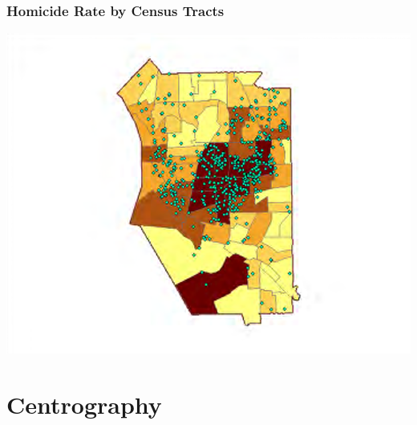 \documentclass[nototal]{beamer}
\begin{document}
	  \begin{frame}
	    \frametitle{Homicide Rate by Census Tracts}
	    \begin{center}
	      \includegraphics[width=.65\linewidth]{homocideRates.png}
	    \end{center}
	  \end{frame}

\section{Centrography}
\end{document}
